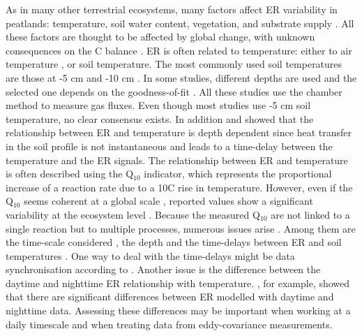 As in many other terrestrial ecosystems, many factors affect ER variability in peatlands: temperature, soil water content, vegetation, and substrate supply \citep{luo2006}.
All these factors are thought to be affected by global change, with unknown consequences on the C balance \citep{limpens2008}.
ER is often related to temperature: either to air temperature \citep[e.g.,][]{bortoluzzi2006}, or soil temperature.
The most commonly used soil temperatures are those at -5 cm \citep{ballantyne2014,gorres2014} and -10 cm \citep{kim1992,zhu2015}.
In some studies, different depths are used and the selected one depends on the goodness-of-fit \citep{gunther2014, zhu2015}.
All these studies use the chamber method to measure gas fluxes.
Even though most studies use -5 cm soil temperature, no clear consensus exists.
In addition \citet{pavelka2007} and \citet{graf2008} showed that the relationship between ER and temperature is depth dependent since heat transfer in the soil profile is not instantaneous and leads to a time-delay between the temperature and the ER signals.
The relationship between ER and temperature is often described using the Q$_{10}$ indicator, which represents the proportional increase of a reaction rate due to a 10\textdegree C rise in temperature.
However, even if the Q$_{10}$ seems coherent at a global scale \citep{mahecha2010}, reported values show a significant variability at the ecosystem level \citep{graf2008}.
Because the measured Q$_{10}$ are not linked to a single reaction but to multiple processes, numerous issues arise \citep{davidson2006}.
Among them are the time-scale considered \citep{curielyuste2004}, the depth \citep{graf2008} and the time-delays between ER and soil temperatures \citep{phillips2011}.
One way to deal with the time-delays might be data synchronisation according to \citet{pavelka2007}.
Another issue is the difference between the daytime and nighttime ER relationship with temperature. 
\citet{juszczak2012}, for example, showed that there are significant differences between ER modelled with daytime and nighttime data.
Assessing these differences may be important when working at a daily timescale and when treating data from eddy-covariance measurements.

